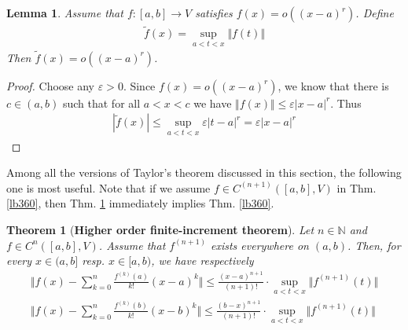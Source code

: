 \documentclass[12pt,b5paper,notitlepage]{article}
\theoremstyle{definition}
\theoremstyle{plain}
\newtheorem{thm}[df]{Theorem}
\newtheorem{lm}[df]{Lemma}
\newcommand{\wtd}{\widetilde}
\newcommand{\Nbb}{\mathbb N}
\newcommand{\eps}{\varepsilon}
\numberwithin{equation}{section}
\begin{document}
\begin{lm}
Assume that $f:[a,b]\rightarrow V$ satisfies $f(x)=o((x-a)^r)$. Define
\begin{align*}
\wtd f(x)=\sup_{a<t<x}\Vert f(t)\Vert
\end{align*}
Then $\wtd f(x)=o((x-a)^r)$.
\end{lm}


\begin{proof}
Choose any $\eps>0$. Since $f(x)=o((x-a)^r)$, we know that there is $c\in (a,b)$ such that for all $a<x<c$ we have $\Vert f(x)\Vert\leq \eps |x-a|^r$. Thus
\begin{align*}
|\wtd f(x)|\leq\sup_{a<t<x}\eps |t-a|^r =\eps|x-a|^r
\end{align*}
\end{proof}


Among all the versions of Taylor's theorem discussed in this section, the following one is most useful. Note that if we assume $f\in C^{(n+1)}([a,b],V)$ in Thm. \ref{lb360}, then Thm. \ref{lb359} immediately implies Thm. \ref{lb360}.  



\begin{thm}[\textbf{Higher order finite-increment theorem}]\label{lb359}
Let $n\in\Nbb$ and $f\in C^n([a,b],V)$. Assume that $f^{(n+1)}$ exists everywhere on $(a,b)$. Then, for every $x\in(a,b]$ resp. $x\in[a,b)$, we have respectively
\begin{subequations}
\begin{gather}
\Big\Vert f(x)-\sum_{k=0}^n\frac{f^{(k)}(a)}{k!}(x-a)^k \Big\Vert \leq \frac{(x-a)^{n+1}}{(n+1)!}\cdot \sup_{a<t<x}\Vert f^{(n+1)}(t)\Vert  \label{eq139}\\
\Big\Vert f(x)-\sum_{k=0}^n\frac{f^{(k)}(b)}{k!}(x-b)^k \Big\Vert \leq \frac{(b-x)^{n+1}}{(n+1)!}\cdot \sup_{a<t<x}\Vert f^{(n+1)}(t)\Vert
\end{gather}
\end{subequations} 
\end{thm}
\end{document}
